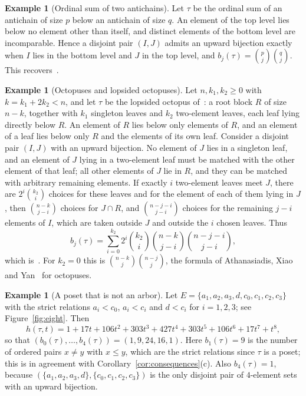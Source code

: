 \documentclass[11pt]{amsart}
\theoremstyle{definition}
\newtheorem{example}[theorem]{Example}
\theoremstyle{remark}
\numberwithin{equation}{section}
\begin{document}
\begin{example}[Ordinal sum of two antichains]
Let $\tau$ be the ordinal sum of an antichain of size $p$ below an antichain of size $q$. An element of the top level lies below no element other than itself, and distinct elements of the bottom level are incomparable. Hence a disjoint pair $(I,J)$ admits an upward bijection exactly when $I$ lies in the bottom level and $J$ in the top level, and $b_j(\tau)=\binom{p}{j}\binom{q}{j}$. This recovers~\cite[Proposition~9.2]{AC}.
\end{example}

\begin{example}[Octopuses and lopsided octopuses]
Let $n,k_1,k_2\ge 0$ with $k=k_1+2k_2<n$, and let $\tau$ be the lopsided octopus of~\cite{Men}: a root block $R$ of size $n-k$, together with $k_1$ singleton leaves and $k_2$ two-element leaves, each leaf lying directly below $R$. An element of $R$ lies below only elements of $R$, and an element of a leaf lies below only $R$ and the elements of its own leaf. Consider a disjoint pair $(I,J)$ with an upward bijection. No element of $J$ lies in a singleton leaf, and an element of $J$ lying in a two-element leaf must be matched with the other element of that leaf; all other elements of $J$ lie in $R$, and they can be matched with arbitrary remaining elements. If exactly $i$ two-element leaves meet $J$, there are $2^i\binom{k_2}{i}$ choices for these leaves and for the element of each of them lying in $J$, then $\binom{n-k}{j-i}$ choices for $J\cap R$, and $\binom{n-j-i}{j-i}$ choices for the remaining $j-i$ elements of $I$, which are taken outside $J$ and outside the $i$ chosen leaves. Thus
\[
b_j(\tau)=\sum_{i=0}^{k_2}2^i\binom{k_2}{i}\binom{n-k}{j-i}\binom{n-j-i}{j-i},
\]
which is~\cite[Proposition~3.4]{Men}. For $k_2=0$ this is $\binom{n-k}{j}\binom{n-j}{j}$, the formula of Athanasiadis, Xiao and Yan~\cite[Proposition~2.2]{AXY} for octopuses.
\end{example}

\begin{example}[A poset that is not an arbor]\label{ex:eight}
Let $E=\{a_1,a_2,a_3,d,c_0,c_1,c_2,c_3\}$ with the strict relations $a_i<c_0$, $a_i<c_i$ and $d<c_i$ for $i=1,2,3$; see Figure~\ref{fig:eight}. Then
\[
h(\tau,t)=1+17t+106t^2+303t^3+427t^4+303t^5+106t^6+17t^7+t^8,
\]
so that $(b_0(\tau),\dots,b_4(\tau))=(1,9,24,16,1)$. Here $b_1(\tau)=9$ is the number of ordered pairs $x\ne y$ with $x\le y$, which are the strict relations since $\tau$ is a poset; this is in agreement with Corollary~\ref{cor:consequences}(c). Also $b_4(\tau)=1$, because $(\{a_1,a_2,a_3,d\},\{c_0,c_1,c_2,c_3\})$ is the only disjoint pair of $4$-element sets with an upward bijection.
\end{example}
\end{document}
